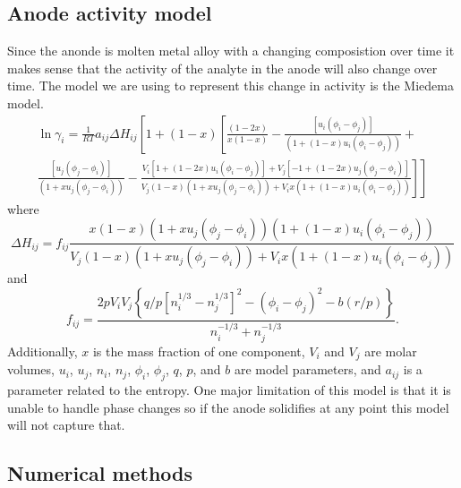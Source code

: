 \documentclass[journal=mamobx]{achemso}
\begin{document}
\subsection{Anode activity model} \label{sec:activity}
Since the anonde is molten metal alloy with a changing composistion over time it makes sense that the activity of the analyte in the anode will also change over time.
The model we are using to represent this change in activity is the Miedema model\cite{Miedema1980}.
\begin{multline}
        \ln\gamma_i = \frac{1}{RT}a_{ij}\Delta H_{ij}\left[1 + (1-x)\left[\frac{\left(1 - 2x\right)}{x\left(1-x\right)} -
\frac{\left[u_{i} \left({\phi}_{i} - {\phi}_{j}\right)\right]}{\left(1 + \left(1 - x\right)u_{i} \left({\phi}_{i} - {\phi}_{j}\right)\right)} + \right. \right.\\
\left. \left. \frac{\left[u_{j} \left({\phi}_{j} - {\phi}_{i}\right)\right]}{\left(1 + xu_{j} \left({\phi}_{j} - {\phi}_{i}\right)\right)} - 
\frac{V_{i} \left[1 + \left(1 - 2x\right)u_{i} \left({\phi}_{i} - {\phi}_{j}\right)  \right]+ V_{j}\left[-1 + \left(1 - 2x\right)u_{j} \left({\phi}_{j} - {\phi}_{i}\right)\right]} 
 {V_{j} \left(1 - x\right) \left(1 + xu_{j} \left({\phi}_{j} - {\phi}_{i}\right)\right) + V_{i}x \left(1 + \left(1 - x\right)u_{i} \left({\phi}_{i} - {\phi}_{j}\right) \right)}\right]\right]
\end{multline}
where 
\begin{equation}
    \Delta H_{ij} = f_{ij}\frac{x\left(1-x\right)\left(1 + xu_{j} \left({\phi}_{j} - {\phi}_{i}\right)\right)\left(1 + \left(1 - x\right)u_{i} \left({\phi}_{i} - {\phi}_{j}\right)\right)}{V_{j} \left(1 - x\right) \left(1 + xu_{j} \left({\phi}_{j} - {\phi}_{i}\right)\right) + V_{i}x \left(1 + \left(1 - x\right)u_{i} \left({\phi}_{i} - {\phi}_{j}\right) \right)}
\end{equation}
and
\begin{equation}
f_{ij} = \frac{2pV_iV_j\left \{q/p\left[n^{1/3}_i - n^{1/3}_j\right]^2-\left(\phi_i-\phi_j\right)^2-b(r/p)\right\}}{n^{-1/3}_i + n^{-1/3}_j}.
\end{equation}
Additionally, $x$ is the mass fraction of one component, $V_i$ and $V_j$ are molar volumes, $u_i$, $u_j$, $n_i$, $n_j$, $\phi_i$, $\phi_j$, $q$, $p$, and $b$ are model parameters, and $a_{ij}$ is a parameter related to the entropy.
One major limitation of this model is that it is unable to handle phase changes so if the anode solidifies at any point this model will not capture that. 
\subsection{Numerical methods}
\end{document}
